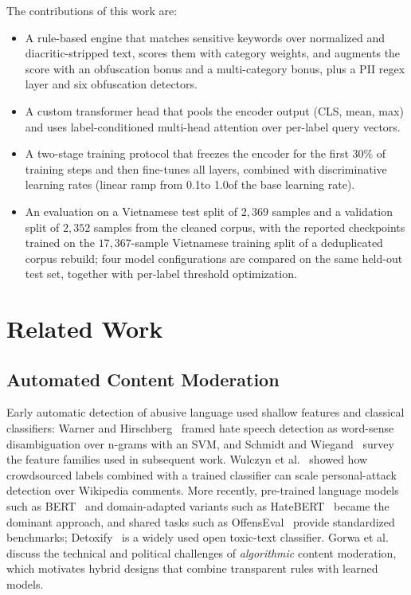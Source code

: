 \documentclass[runningheads]{llncs}
\begin{document}
The contributions of this work are:
\begin{itemize}[leftmargin=*]
\item A rule-based engine that matches sensitive keywords over normalized and diacritic-stripped text, scores them with category weights, and augments the score with an obfuscation bonus and a multi-category bonus, plus a PII regex layer and six obfuscation detectors.
\item A custom transformer head that pools the encoder output (CLS, mean, max) and uses label-conditioned multi-head attention over per-label query vectors.
\item A two-stage training protocol that freezes the encoder for the first 30\% of training steps and then fine-tunes all layers, combined with discriminative learning rates (linear ramp from 0.1\texttimes to 1.0\texttimes of the base learning rate).
\item An evaluation on a Vietnamese test split of $2{,}369$ samples and a validation split of $2{,}352$ samples from the cleaned corpus, with the reported checkpoints trained on the $17{,}367$-sample Vietnamese training split of a deduplicated corpus rebuild; four model configurations are compared on the same held-out test set, together with per-label threshold optimization.
\end{itemize}

\section{Related Work}
\label{sec:related}

\subsection{Automated Content Moderation}

Early automatic detection of abusive language used shallow features and classical classifiers: Warner and Hirschberg~\cite{warner2012} framed hate speech detection as word-sense disambiguation over n-grams with an SVM, and Schmidt and Wiegand~\cite{schmidt2017} survey the feature families used in subsequent work.
Wulczyn et al.~\cite{wulczyn2017} showed how crowdsourced labels combined with a trained classifier can scale personal-attack detection over Wikipedia comments.
More recently, pre-trained language models such as BERT~\cite{devlin2019} and domain-adapted variants such as HateBERT~\cite{caselli2021} became the dominant approach, and shared tasks such as OffensEval~\cite{zampieri2019} provide standardized benchmarks; Detoxify~\cite{hanu2020} is a widely used open toxic-text classifier.
Gorwa et al.~\cite{gorwa2020} discuss the technical and political challenges of \emph{algorithmic} content moderation, which motivates hybrid designs that combine transparent rules with learned models.
\end{document}
